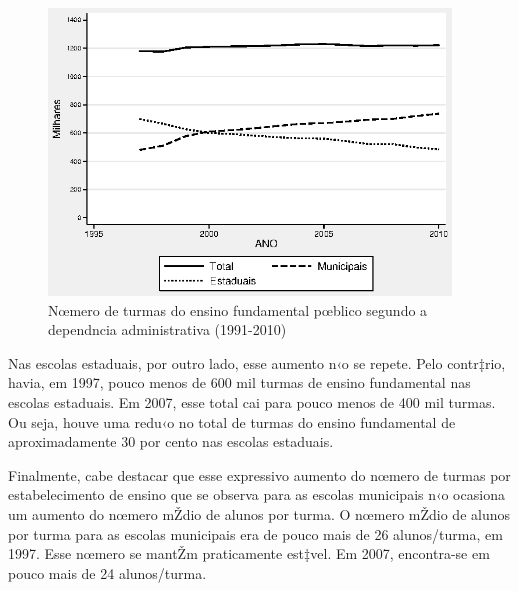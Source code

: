 \documentclass[a4paper, 12pt]{article}
\begin{document}

\vspace*{1cm} 

\begin{figure}[h]
\centering
\begin{footnotesize}
\caption{Nœmero de turmas do ensino fundamental pœblico  
\newline segundo a dependncia administrativa (1991-2010)} 
\label{fig:turmas}                             
 \includegraphics[height=3in]{turmas}
\end{footnotesize}
\end{figure}
 
\vspace*{0.5cm} 




Nas escolas estaduais, por outro lado, esse aumento n‹o se repete. Pelo contr‡rio, havia, em 1997, pouco menos de 600 mil turmas de ensino fundamental nas escolas estaduais. Em 2007, esse total cai para pouco menos de 400 mil turmas. Ou seja, houve uma redu‹o no total de turmas do ensino fundamental de aproximadamente 30 por cento nas escolas estaduais. 
 
Finalmente, cabe destacar que esse expressivo aumento do nœmero de turmas por estabelecimento de ensino que se observa para as escolas municipais n‹o ocasiona um aumento do nœmero mŽdio de alunos por turma. O nœmero mŽdio de alunos por turma para as escolas municipais era de pouco mais de 26 alunos/turma, em 1997. Esse nœmero se mantŽm praticamente est‡vel. Em 2007, encontra-se em pouco mais de 24 alunos/turma. 
 
 
 
 
 
\end{document}
